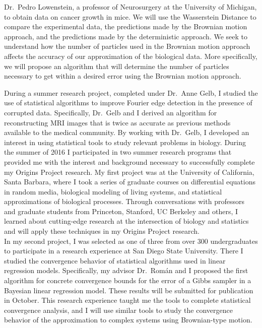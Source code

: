 \documentclass[8 pt, leqno]{article}
\begin{document}
Dr.\ Pedro Lowenstein, a professor of Neurosurgery at the University of Michigan, to obtain data on cancer growth in mice. We will use the Wasserstein Distance to compare the experimental data, the predictions made by the Brownian motion approach, and the predictions made by the deterministic approach.  We seek to understand how the number of particles used in the Brownian motion approach affects the accuracy of our approximation of the biological data. More specifically, we will propose an algorithm that will determine the number of particles necessary to get within a desired error using the Brownian motion approach. 

\indent During a summer research project, completed under Dr.\ Anne Gelb, I studied the use of statistical algorithms to improve Fourier edge detection in the presence of corrupted data. Specifically, Dr.\ Gelb and I derived an algorithm for reconstructing MRI images that is twice as accurate as previous methods available to the medical community. By working with Dr.\ Gelb, I developed an interest in using statistical tools to study relevant problems in biology. During the summer of 2016 I participated in two summer research programs that provided me with the interest and background necessary to successfully complete my Origins Project research. My first project was at the University of California, Santa Barbara, where I took a series of graduate courses on differential equations in random media, biological modeling of living systems, and statistical approximations of biological processes. Through conversations with professors and graduate students from Princeton, Stanford, UC Berkeley and others, I learned about cutting-edge research at the intersection of biology and statistics and will apply these techniques in my Origins Project research.\\
\indent In my second project, I was selected as one of three from over 300 undergraduates to participate in a research experience at San Diego State University. There I studied the convergence behavior of statistical algorithms used in linear regression models. Specifically, my advisor Dr.\ Rom\'{a}n and I proposed the first algorithm for concrete convergence bounds for the error of a Gibbs sampler in a Bayesian linear regression model. These results will be submitted for publication in October. This research experience taught me the tools to complete statistical convergence analysis, and I will use similar tools to study the convergence behavior of the approximation to complex systems using Brownian-type motion. \\
\end{document}
